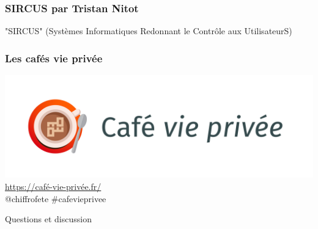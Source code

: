 \documentclass{beamer}
\begin{document}
\begin{frame}
\frametitle{SIRCUS par Tristan Nitot}
"SIRCUS" (Systèmes Informatiques Redonnant le Contrôle aux UtilisateurS)
\end{frame}
\begin{frame}
\frametitle{Les cafés vie privée}
\begin{center}
\includegraphics[scale=0.4]{./images/LogoCafeViePrivee.jpg}
\\ \url{https://café-vie-privée.fr/}
\\ @chiffrofete \#cafevieprivee
\end{center}
\end{frame}
\begin{frame}
\begin{center}
\Huge{Questions et discussion}
\end{center}
\end{frame}
\end{document}
